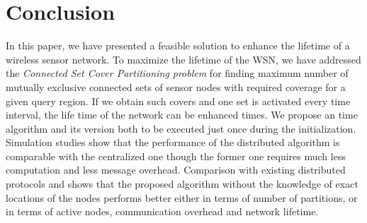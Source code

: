 \documentclass{acm_proc_article-sp}
\begin{document}
\section{Conclusion}
\label{sec_5}
In this paper, we have presented a feasible solution to enhance the lifetime of a wireless sensor network. To maximize the lifetime of the WSN, we have addressed the {\it Connected Set Cover Partitioning problem} for finding maximum number of mutually exclusive connected sets of sensor nodes with required coverage for a given query region. If we obtain  such covers and one set is activated every  time interval, the life time of the network can be enhanced  times. We propose an  time  algorithm and its  version both to be executed just once during the initialization. Simulation studies show that the performance of the distributed algorithm is comparable with the centralized one though the former one requires much less computation and less message overhead. Comparison with existing distributed protocols \cite{Pervin} and \cite{Gallais} shows that the proposed algorithm without the knowledge of exact locations of the nodes performs better either in terms 
of number of partitions, or in terms of active nodes, communication overhead and network lifetime.



 

\end{document}
